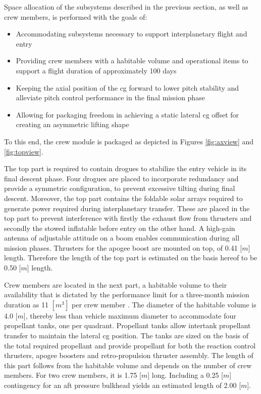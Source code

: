 Space allocation of the subsystems described in the previous section, as well as crew members, is performed with the goals of:
\begin{itemize}
\item Accommodating subsystems necessary to support interplanetary flight and entry
\item Providing crew members with a habitable volume and operational items to support a flight duration of approximately 100 days
\item Keeping the axial position of the \gls{cg} forward to lower pitch stability and alleviate pitch control performance in the final mission phase
\item Allowing for packaging freedom in achieving a static lateral \gls{cg} offset for creating an asymmetric lifting shape
\end{itemize}
To this end, the crew module is packaged as depicted in Figures \ref{fig:axview} and \ref{fig:topview}. 

The top part is required to contain drogues to stabilize the entry vehicle in its final descent phase. Four drogues are placed to incorporate redundancy and provide
a symmetric configuration, to prevent excessive tilting during final descent. Moreover, the top part contains the foldable solar arrays required to generate power required during interplanetary transfer. These are placed in the top part to prevent interference with firstly the exhaust flow from thrusters and secondly the stowed inflatable before entry on the other hand. A high-gain antenna of adjustable attitude on a boom enables communication during all mission phases. Thrusters for the apogee boost are mounted on top, of 0.41 [$m$] length. Therefore the length of the top part is estimated on the basis hereof to be 0.50 [$m$] length.

Crew members are located in the next part, a habitable volume to their availability that is dictated by the performance limit for a three-month mission duration as 11 $[m^{3}]$ per crew member \cite{Rudisill2008}. The diameter of the habitable volume is 4.0 [$m$], thereby less than vehicle maximum diameter to accommodate four propellant tanks, one per quadrant. Propellant tanks allow intertank propellant transfer to maintain the lateral \gls{cg} position. The tanks are sized on the basis of the total required propellant and provide propellant for both the reaction control thrusters, apogee boosters and retro-propulsion thruster assembly. The length of this part follows from the habitable volume and depends on the number of crew members. For two crew members, it is 1.75 [$m$] long. Including a 0.25 [$m$] contingency for an aft pressure bulkhead yields an estimated length of 2.00 [$m$].

